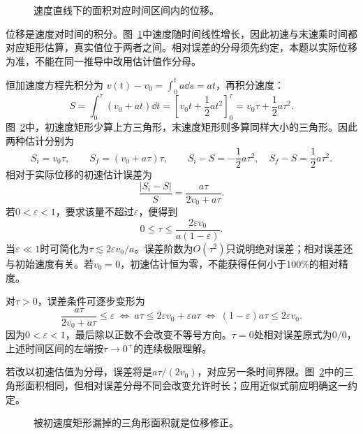 \begin{figure}[H]\centering
{}
\caption{速度直线下的面积对应时间区间内的位移。}\label{fig:c1-h1-q}
\end{figure}
\begin{solution}
位移是速度对时间的积分。图~\ref{fig:c1-h1-q}中速度随时间线性增长，因此初速与末速乘时间都对应矩形估算，真实值位于两者之间。相对误差的分母须先约定，本题以实际位移为准，不能在同一推导中改用估计值作分母。


恒加速度方程先积分为 $v(t)-v_0=\int_0^ta\dd s=at$，再积分速度：
\[
S=\int_0^\tau(v_0+at)\dd t
=\left[v_0t+\frac12at^2\right]_0^\tau
=v_0\tau+\frac12a\tau^2.
\]
图~\ref{fig:c1-h1-s}中，初速度矩形少算上方三角形，末速度矩形则多算同样大小的三角形。因此两种估计分别为
\[S_i=v_0\tau,\qquad S_f=(v_0+a\tau)\tau,
\qquad S_i-S=-\frac12a\tau^2,\quad S_f-S=\frac12a\tau^2.
\]
相对于实际位移的初速估计误差为
\[\frac{|S_i-S|}{S}=\frac{a\tau}{2v_0+a\tau}.
\]
若$0<\varepsilon<1$，要求该量不超过$\varepsilon$，便得到
\[\boxed{0\le\tau\le\frac{2\varepsilon v_0}{a(1-\varepsilon)}}.
\]
当$\varepsilon\ll1$时可简化为$\tau\lesssim2\varepsilon v_0/a$。误差阶数为$O(\tau^2)$只说明绝对误差；相对误差还与初始速度有关。若$v_0=0$，初速估计恒为零，不能获得任何小于$100\%$的相对精度。


对$\tau>0$，误差条件可逐步变形为
\[\frac{a\tau}{2v_0+a\tau}\le\varepsilon
\ \Longleftrightarrow\ a\tau\le2\varepsilon v_0+\varepsilon a\tau
\ \Longleftrightarrow\ (1-\varepsilon)a\tau\le2\varepsilon v_0.\]
因为$0<\varepsilon<1$，最后除以正数不会改变不等号方向。$\tau=0$处相对误差原式为$0/0$，上述时间区间的左端按$\tau\to0^+$的连续极限理解。

若改以初速估值为分母，误差将是$a\tau/(2v_0)$，对应另一条时间界限。图~\ref{fig:c1-h1-s}中的三角形面积相同，但相对误差分母不同会改变允许时长；应用近似式前应明确这一约定。

\begin{figure}[H]\centering
{}
\caption{被初速度矩形漏掉的三角形面积就是位移修正。}\label{fig:c1-h1-s}
\end{figure}
\end{solution}

